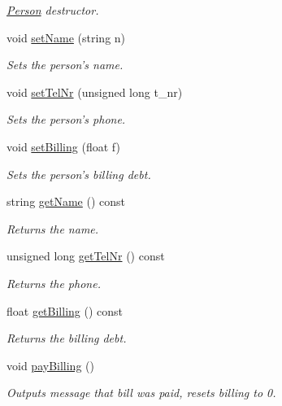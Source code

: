 \begin{DoxyCompactItemize}
\begin{DoxyCompactList}\small\item\em \hyperlink{class_person}{Person} destructor. \end{DoxyCompactList}\item 
void \hyperlink{class_person_a62b6b1cc2b0ce6dfa92786cfe2857362}{set\+Name} (string n)
\begin{DoxyCompactList}\small\item\em Sets the person's name. \end{DoxyCompactList}\item 
void \hyperlink{class_person_a7f178b2627a33e86c965bfaa0cc77ff0}{set\+Tel\+Nr} (unsigned long t\+\_\+nr)
\begin{DoxyCompactList}\small\item\em Sets the person's phone. \end{DoxyCompactList}\item 
void \hyperlink{class_person_ac52c35916ca323635f9b58cceaf7bfad}{set\+Billing} (float f)
\begin{DoxyCompactList}\small\item\em Sets the person's billing debt. \end{DoxyCompactList}\item 
string \hyperlink{class_person_a5c06a41731a2656caec65e3bc39f5ebe}{get\+Name} () const 
\begin{DoxyCompactList}\small\item\em Returns the name. \end{DoxyCompactList}\item 
unsigned long \hyperlink{class_person_a1b3237d0eba60fa12437ad8794729b16}{get\+Tel\+Nr} () const 
\begin{DoxyCompactList}\small\item\em Returns the phone. \end{DoxyCompactList}\item 
float \hyperlink{class_person_ad84e50825f66a2ab7f2571698f07cbbf}{get\+Billing} () const 
\begin{DoxyCompactList}\small\item\em Returns the billing debt. \end{DoxyCompactList}\item 
\hypertarget{class_person_a0dcd76e4e697490120f0c3417414c1a6}{void \hyperlink{class_person_a0dcd76e4e697490120f0c3417414c1a6}{pay\+Billing} ()}\label{class_person_a0dcd76e4e697490120f0c3417414c1a6}

\begin{DoxyCompactList}\small\item\em Outputs message that bill was paid, resets billing to 0. \end{DoxyCompactList}\end{DoxyCompactItemize}
